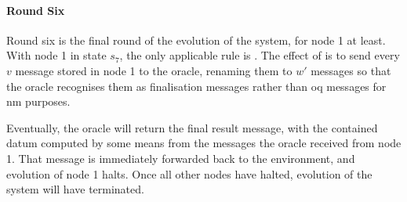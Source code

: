\paragraph{Round Six}
Round six is the final round of the evolution of the system, for node 1 at least.  With node 1 in state \(s_7\), the only applicable rule is .  The effect of  is to send every \(v\) message stored in node 1 to the oracle, renaming them to \(w'\) messages so that the oracle recognises them as finalisation messages rather than \gls{oq} messages for \gls{nm} purposes.

Eventually, the oracle will return the final result message, with the contained datum computed by some means from the messages the oracle received from node 1.  That message is immediately forwarded back to the environment, and evolution of node 1 halts.  Once all other nodes have halted, evolution of the system will have terminated.